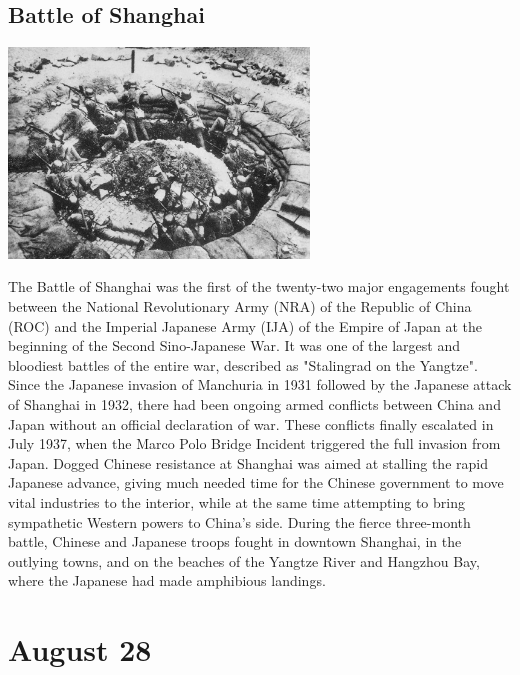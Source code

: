 \documentclass[11pt]{report}
\begin{document}
\subsection{Battle of Shanghai}
\vspace{2mm}\begin{center}\includegraphics[width=8cm]{./img/battleOfShanghai.jpg}\end{center}
The Battle of Shanghai was the first of the twenty-two major engagements fought between the National Revolutionary Army (NRA) of the Republic of China (ROC) and the Imperial Japanese Army (IJA) of the Empire of Japan at the beginning of the Second Sino-Japanese War. It was one of the largest and bloodiest battles of the entire war, described as "Stalingrad on the Yangtze".\\
\indent Since the Japanese invasion of Manchuria in 1931 followed by the Japanese attack of Shanghai in 1932, there had been ongoing armed conflicts between China and Japan without an official declaration of war. These conflicts finally escalated in July 1937, when the Marco Polo Bridge Incident triggered the full invasion from Japan. Dogged Chinese resistance at Shanghai was aimed at stalling the rapid Japanese advance, giving much needed time for the Chinese government to move vital industries to the interior, while at the same time attempting to bring sympathetic Western powers to China's side. During the fierce three-month battle, Chinese and Japanese troops fought in downtown Shanghai, in the outlying towns, and on the beaches of the Yangtze River and Hangzhou Bay, where the Japanese had made amphibious landings.
\section{August 28}
\end{document}
